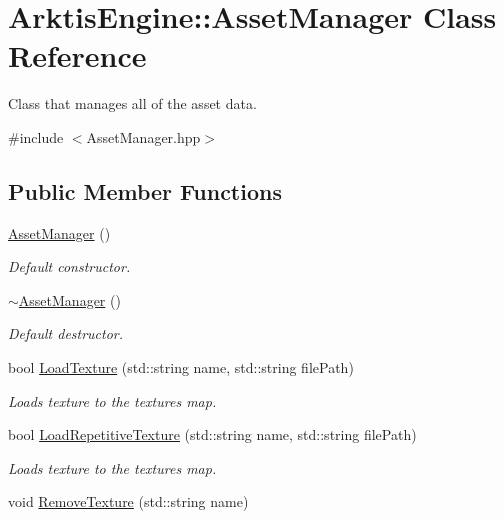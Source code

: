 \hypertarget{class_arktis_engine_1_1_asset_manager}{}\section{Arktis\+Engine\+::Asset\+Manager Class Reference}
\label{class_arktis_engine_1_1_asset_manager}


Class that manages all of the asset data.  




{\ttfamily \#include $<$Asset\+Manager.\+hpp$>$}

\subsection*{Public Member Functions}
\begin{DoxyCompactItemize}
\item 
\mbox{\hyperlink{class_arktis_engine_1_1_asset_manager_a83b4e37fd637e66918ecc86fe583247e}{Asset\+Manager}} ()
\begin{DoxyCompactList}\small\item\em Default constructor. \end{DoxyCompactList}\item 
\mbox{\hyperlink{class_arktis_engine_1_1_asset_manager_a1fb7409422cd902a2b1cafead009a6d2}{$\sim$\+Asset\+Manager}} ()
\begin{DoxyCompactList}\small\item\em Default destructor. \end{DoxyCompactList}\item 
bool \mbox{\hyperlink{class_arktis_engine_1_1_asset_manager_a69101c1f6e84b7e1f6e71a1fc8ae1543}{Load\+Texture}} (std\+::string name, std\+::string file\+Path)
\begin{DoxyCompactList}\small\item\em Loads texture to the textures map. \end{DoxyCompactList}\item 
bool \mbox{\hyperlink{class_arktis_engine_1_1_asset_manager_adf4904f82f595623f8e40134a7a9d398}{Load\+Repetitive\+Texture}} (std\+::string name, std\+::string file\+Path)
\begin{DoxyCompactList}\small\item\em Loads texture to the textures map. \end{DoxyCompactList}\item 
void \mbox{\hyperlink{class_arktis_engine_1_1_asset_manager_a91c15c5726d420f3516a8ac4c2cba6d8}{Remove\+Texture}} (std\+::string name)

\end{DoxyCompactItemize}
